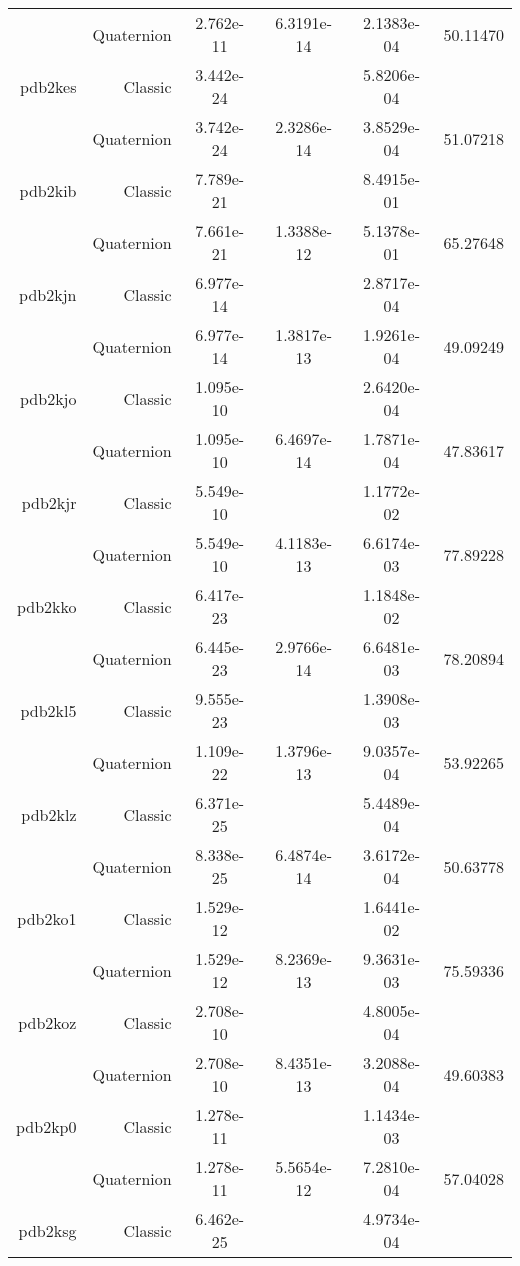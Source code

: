 \begin{xltabular}{\textwidth}{r|rS[table-format=1.3e+2]S[table-format=1.4e+2]S[table-format=1.4e+2]S[table-format=-1.5]}
& Quaternion & 2.762e-11 & 6.3191e-14 & 2.1383e-04 & 50.11470\\  \addlinespace
pdb2kes & Classic & 3.442e-24 &  & 5.8206e-04 & \\
& Quaternion & 3.742e-24 & 2.3286e-14 & 3.8529e-04 & 51.07218\\  \addlinespace
pdb2kib & Classic & 7.789e-21 &  & 8.4915e-01 & \\
& Quaternion & 7.661e-21 & 1.3388e-12 & 5.1378e-01 & 65.27648\\  \addlinespace
pdb2kjn & Classic & 6.977e-14 &  & 2.8717e-04 & \\
& Quaternion & 6.977e-14 & 1.3817e-13 & 1.9261e-04 & 49.09249\\  \addlinespace
pdb2kjo & Classic & 1.095e-10 &  & 2.6420e-04 & \\
& Quaternion & 1.095e-10 & 6.4697e-14 & 1.7871e-04 & 47.83617\\  \addlinespace
pdb2kjr & Classic & 5.549e-10 &  & 1.1772e-02 & \\
& Quaternion & 5.549e-10 & 4.1183e-13 & 6.6174e-03 & 77.89228\\  \addlinespace
pdb2kko & Classic & 6.417e-23 &  & 1.1848e-02 & \\
& Quaternion & 6.445e-23 & 2.9766e-14 & 6.6481e-03 & 78.20894\\  \addlinespace
pdb2kl5 & Classic & 9.555e-23 &  & 1.3908e-03 & \\
& Quaternion & 1.109e-22 & 1.3796e-13 & 9.0357e-04 & 53.92265\\  \addlinespace
pdb2klz & Classic & 6.371e-25 &  & 5.4489e-04 & \\
& Quaternion & 8.338e-25 & 6.4874e-14 & 3.6172e-04 & 50.63778\\  \addlinespace
pdb2ko1 & Classic & 1.529e-12 &  & 1.6441e-02 & \\
& Quaternion & 1.529e-12 & 8.2369e-13 & 9.3631e-03 & 75.59336\\  \addlinespace
pdb2koz & Classic & 2.708e-10 &  & 4.8005e-04 & \\
& Quaternion & 2.708e-10 & 8.4351e-13 & 3.2088e-04 & 49.60383\\  \addlinespace
pdb2kp0 & Classic & 1.278e-11 &  & 1.1434e-03 & \\
& Quaternion & 1.278e-11 & 5.5654e-12 & 7.2810e-04 & 57.04028\\  \addlinespace
pdb2ksg & Classic & 6.462e-25 &  & 4.9734e-04 & \\

\end{xltabular}
